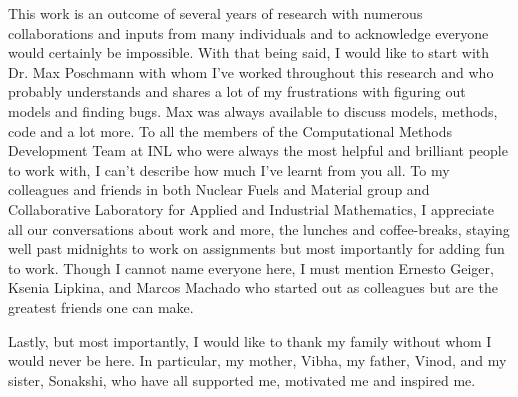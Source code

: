 This work is an outcome of several years of research with numerous collaborations and inputs from many individuals and to acknowledge everyone would certainly be impossible. With that being said, I would like to start with Dr. Max Poschmann with whom I've worked throughout this research and who probably understands and shares a lot of my frustrations with figuring out models and finding bugs. Max was always available to discuss models, methods, code and a lot more. To all the members of the Computational Methods Development Team at INL who were always the most helpful and brilliant people to work with, I can't describe how much I've learnt from you all. To my colleagues and friends in both Nuclear Fuels and Material group and Collaborative Laboratory for Applied and Industrial Mathematics, I appreciate all our conversations about work and more, the lunches and coffee-breaks, staying well past midnights to work on assignments but most importantly for adding fun to work. Though I cannot name everyone here, I must mention Ernesto Geiger, Ksenia Lipkina, and Marcos Machado who started out as colleagues but are the greatest friends one can make.

Lastly, but most importantly, I would like to thank my family without whom I would never be here. In particular, my mother, Vibha, my father, Vinod, and my sister, Sonakshi, who have all supported me, motivated me and inspired me. 



